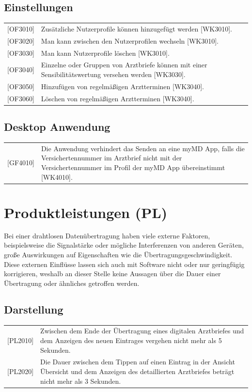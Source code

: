 \documentclass[a4paper]{scrreprt}
\begin{document}
\subsection{Einstellungen}
\begin{tabular}{lll}
[OF3010] &  \multicolumn{2}{p{12cm}}{Zusätzliche Nutzerprofile können hinzugefügt werden [WK3010].}\\
{[OF3020]} &  \multicolumn{2}{p{12cm}}{Man kann zwischen den Nutzerprofilen wechseln [WK3010].}\\
{[OF3030]} &  \multicolumn{2}{p{12cm}}{Man kann Nutzerprofile löschen [WK3010].}\\
{[OF3040]} &  \multicolumn{2}{p{12cm}}{Einzelne oder Gruppen von Arztbriefe können mit einer Sensibilitätswertung versehen werden [WK3030].}  \\
{[OF3050]} &  \multicolumn{2}{p{12cm}}{Hinzufügen von regelmäßigen Arztterminen [WK3040].}  \\
{[OF3060]} &  \multicolumn{2}{p{12cm}}{Löschen von regelmäßigen Arztterminen [WK3040].}  \\
\end{tabular}

\subsection{Desktop Anwendung}
\begin{tabular}{lll}
{[GF4010]}&  \multicolumn{2}{p{12cm}}{Die Anwendung verhindert das Senden an eine myMD \gls{App}, falls die Versichertennummer im Arztbrief nicht mit der Versichertennummer im Profil der myMD App übereinstimmt [WK4010].}\\
\end{tabular}


\section{Produktleistungen (PL)}
Bei einer drahtlosen Datenübertragung haben viele externe Faktoren, beispielsweise die Signalstärke oder mögliche Interferenzen von anderen Geräten, große Auswirkungen auf Eigenschaften wie die Übertragungsgeschwindigkeit. Diese externen Einflüsse lassen sich auch mit Software nicht oder nur geringfügig korrigieren, weshalb an dieser Stelle keine Aussagen über die Dauer einer Übertragung oder ähnliches getroffen werden.


\subsection{Darstellung}
\begin{tabular}{lll}
[PL2010]&  \multicolumn{2}{p{12cm}}{Zwischen dem Ende der Übertragung eines digitalen Arztbriefes und dem Anzeigen des neuen Eintrages vergehen nicht mehr als 5 Sekunden.}\\
{[PL2020]}&  \multicolumn{2}{p{12cm}}{Die Dauer zwischen dem Tippen auf einen Eintrag in der Ansicht Übersicht und dem Anzeigen des detaillierten Arztbriefes beträgt nicht mehr als 3 Sekunden.}\\

\end{tabular}
\end{document}
